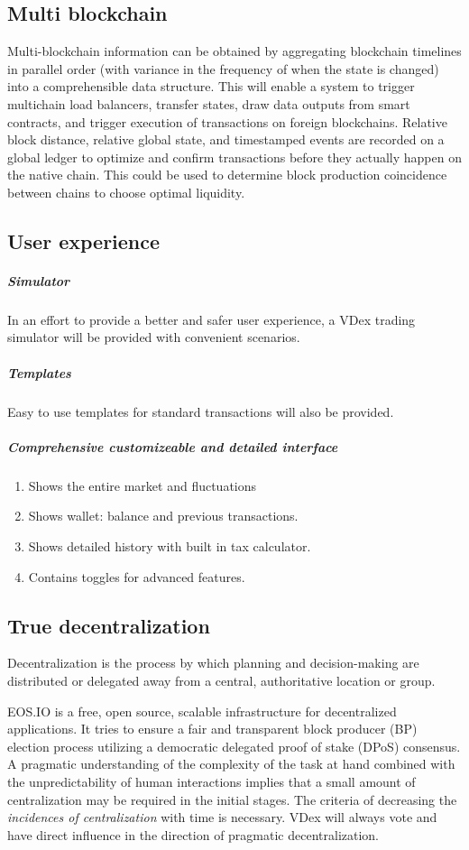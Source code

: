 \documentclass[]{article}
\begin{document}
	
	\subsection{Multi blockchain}
	Multi-blockchain information can be obtained by aggregating blockchain timelines in parallel order 
	(with variance in the frequency of when the state is changed) into a comprehensible data structure.
	This will enable a system to trigger multichain load balancers, transfer states, draw data outputs from smart contracts, 
	and trigger execution of transactions on foreign blockchains. 
	Relative block distance, relative global state, and timestamped events are recorded on a global ledger to optimize and confirm transactions 
	before they actually happen on the native chain.
	This could be used to determine block production coincidence between chains to choose optimal liquidity.\cite{20}
	
	\subsection{User experience}
	\subparagraph{Simulator}
	In an effort to provide a better and safer user experience, 
	a VDex trading simulator will be provided with convenient scenarios.
	\subparagraph{Templates}
	Easy to use templates for standard transactions will also be provided.
	\subparagraph{Comprehensive customizeable and detailed interface}
	\begin{enumerate}
		\item Shows the entire market and fluctuations
		\item Shows wallet: balance and previous transactions.
		\item Shows detailed history with built in tax calculator.
		\item Contains toggles for advanced features.		 
	\end{enumerate}
	
	\subsection{True decentralization}
	 Decentralization is the process by which planning and decision-making are distributed or delegated away 
	 from a central, authoritative location or group.
	 
	 EOS.IO is a free, open source, scalable infrastructure for decentralized applications. 
	 It tries to ensure a fair and transparent block producer (BP) election process 
	 utilizing a democratic delegated proof of stake (DPoS) consensus.
	 A pragmatic understanding of the complexity of the task at hand combined with the unpredictability of human interactions 
	 implies that a small amount of centralization may be required in the initial stages.
	 The criteria of decreasing the \textit{incidences of centralization} with time is necessary. 
	 VDex will always vote and have direct influence in the direction of pragmatic decentralization.
	 
\end{document}
